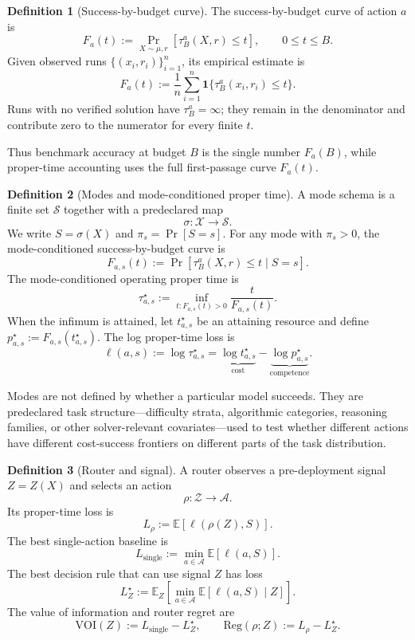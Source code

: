 \documentclass[10pt,twocolumn]{article}
\theoremstyle{definition}
\newtheorem{definition}{Definition}
\theoremstyle{plain}
\theoremstyle{remark}
\begin{document}
\begin{definition}[Success-by-budget curve]
\label{def:success-curve}
The success-by-budget curve of action \(a\) is
\[
    F_a(t)
    :=
    \Pr_{X\sim\mu,r}
    \left[
        \tau^a_B(X,r)\le t
    \right],
    \qquad 0\le t\le B.
\]
Given observed runs \(\{(x_i,r_i)\}_{i=1}^n\), its empirical estimate is
\[
    \widehat F_a(t)
    :=
    \frac{1}{n}
    \sum_{i=1}^n
    \mathbf 1\{\tau^a_B(x_i,r_i)\le t\}.
\]
Runs with no verified solution have \(\tau^a_B=\infty\); they remain in the
denominator and contribute zero to the numerator for every finite \(t\).
\end{definition}

Thus benchmark accuracy at budget \(B\) is the single number \(F_a(B)\), while
proper-time accounting uses the full first-passage curve \(F_a(t)\).

\begin{definition}[Modes and mode-conditioned proper time]
\label{def:modes}
A mode schema is a finite set \(\mathcal S\) together with a predeclared map
\[
    \sigma:\mathcal X\to\mathcal S.
\]
We write \(S=\sigma(X)\) and \(\pi_s=\Pr[S=s]\).  For any mode with
\(\pi_s>0\), the mode-conditioned success-by-budget curve is
\[
    F_{a,s}(t)
    :=
    \Pr\left[
        \tau^a_B(X,r)\le t
        \mid S=s
    \right].
\]
The mode-conditioned operating proper time is
\[
    \tau^\star_{a,s}
    :=
    \inf_{t:F_{a,s}(t)>0}
    \frac{t}{F_{a,s}(t)}.
\]
When the infimum is attained, let \(t^\star_{a,s}\) be an attaining resource
and define \(p^\star_{a,s}:=F_{a,s}(t^\star_{a,s})\).  The log proper-time loss
is
\[
    \ell(a,s)
    :=
    \log \tau^\star_{a,s}
    =
    \underbrace{\log t^\star_{a,s}}_{\text{cost}}
    -
    \underbrace{\log p^\star_{a,s}}_{\text{competence}}.
\]
\end{definition}

Modes are not defined by whether a particular model succeeds.  They are
predeclared task structure---difficulty strata, algorithmic categories,
reasoning families, or other solver-relevant covariates---used to test whether
different actions have different cost-success frontiers on different parts of
the task distribution.

\begin{definition}[Router and signal]
\label{def:router}
A router observes a pre-deployment signal \(Z=Z(X)\) and selects an action
\[
    \rho:\mathcal Z\to\mathcal A.
\]
Its proper-time loss is
\[
    L_\rho
    :=
    \mathbb E\!\left[\ell(\rho(Z),S)\right].
\]
The best single-action baseline is
\[
    L_{\mathrm{single}}
    :=
    \min_{a\in\mathcal A}
    \mathbb E[\ell(a,S)].
\]
The best decision rule that can use signal \(Z\) has loss
\[
    L_Z^\star
    :=
    \mathbb E_Z
    \left[
        \min_{a\in\mathcal A}
        \mathbb E[\ell(a,S)\mid Z]
    \right].
\]
The value of information and router regret are
\[
    \mathrm{VOI}(Z)
    :=
    L_{\mathrm{single}}-L_Z^\star,
    \qquad
    \mathrm{Reg}(\rho;Z)
    :=
    L_\rho-L_Z^\star.
\]
\end{definition}
\end{document}
